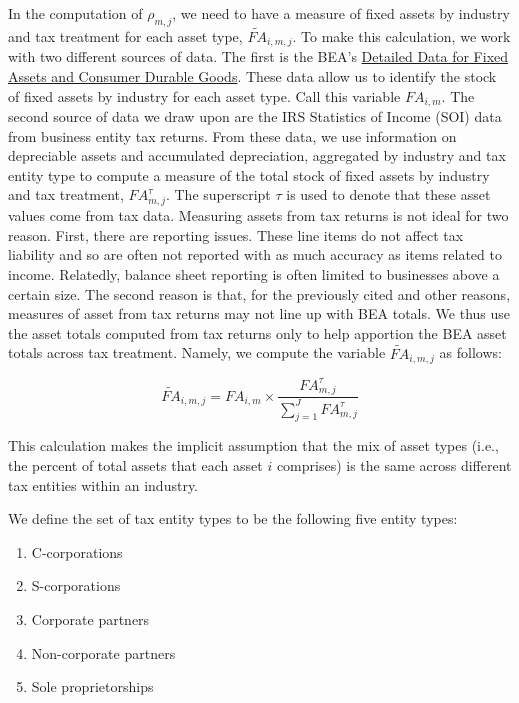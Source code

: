 \documentclass[article,11pt,letterpaper,fleqn]{article}
\theoremstyle{definition}
\numberwithin{equation}{section}
\begin{document}
In the computation of $\rho_{m,j}$, we need to have a measure of fixed assets by industry and tax treatment for each asset type, $\widetilde{FA}_{i,m,j}$.  To make this calculation, we work with two different sources of data.  The first is the BEA's \href{http://www.bea.gov/national/FA2004/Details/Index.html}{Detailed Data for Fixed Assets and Consumer Durable Goods}.  These data allow us to identify the stock of fixed assets by industry for each asset type.  Call this variable $FA_{i,m}$.  The second source of data we draw upon are the IRS Statistics of Income (SOI) data from business entity tax returns.  From these data, we use information on depreciable assets and accumulated depreciation, aggregated by industry and tax entity type to compute a measure of the total stock of fixed assets by industry and tax treatment, $FA^{\tau}_{m,j}$.  The superscript $\tau$ is used to denote that these asset values come from tax data.  Measuring assets from tax returns is not ideal for two reason.  First, there are reporting issues.  These line items do not affect tax liability and so are often not reported with as much accuracy as items related to income.  Relatedly, balance sheet reporting is often limited to businesses above a certain size.  The second reason is that, for the previously cited and other reasons, measures of asset from tax returns may not line up with BEA totals.  We thus use the asset totals computed from tax returns only to help apportion the BEA asset totals across tax treatment.  Namely, we compute the variable $\widetilde{FA}_{i,m,j}$ as follows:

\begin{equation}
\label{eqn:asset_bridge}
\widetilde{FA}_{i,m,j} = FA_{i,m}\times \frac{FA^{\tau}_{m,j}}{\sum_{j=1}^{J} FA^{\tau}_{m,j}}
\end{equation}

\noindent\noindent This calculation makes the implicit assumption that the mix of asset types (i.e., the percent of total assets that each asset $i$ comprises) is the same across different tax entities within an industry.  

We define the set of tax entity types to be the following five entity types:
\begin{enumerate}
\item C-corporations
\item S-corporations
\item Corporate partners
\item Non-corporate partners
\item Sole proprietorships
\end{enumerate}
\end{document}
